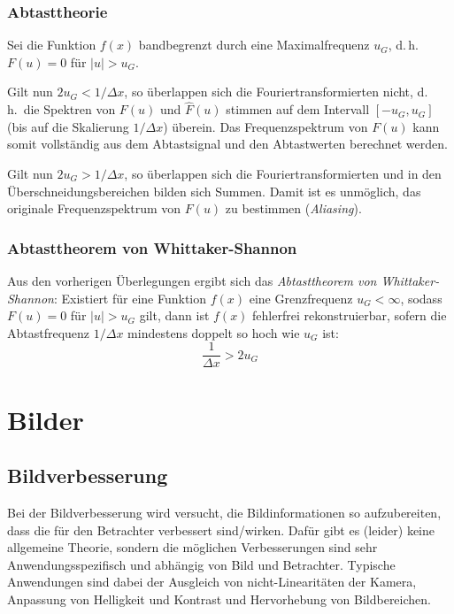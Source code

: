 \documentclass[a4paper, 11pt, accentcolor = tud3b]{tudreport}
\renewcommand{\dh}{d.\,h.~}
\begin{document}
			\subsection{Abtasttheorie}
				Sei die Funktion \( f(x) \) bandbegrenzt durch eine Maximalfrequenz \( u_G \), \dh \( F(u) = 0 \) für \( \lvert u \rvert > u_G \).
				
				Gilt nun \( 2u_G < 1 / \Delta x \), so überlappen sich die Fouriertransformierten nicht, \dh die Spektren von \( F(u) \) und \( \hat{F}(u) \) stimmen auf dem Intervall \( [-u_G, u_G] \) (bis auf die Skalierung \( 1 / \Delta x \)) überein. Das Frequenzspektrum von \( F(u) \) kann somit vollständig aus dem Abtastsignal und den Abtastwerten berechnet werden.
				
				Gilt nun \( 2u_G > 1 / \Delta x \), so überlappen sich die Fouriertransformierten und in den Überschneidungsbereichen bilden sich Summen. Damit ist es unmöglich, das originale Frequenzspektrum von \( F(u) \) zu bestimmen (\emph{Aliasing}).

			\subsection{Abtasttheorem von Whittaker-Shannon}
				Aus den vorherigen Überlegungen ergibt sich das \emph{Abtasttheorem von Whittaker-Shannon}: Existiert für eine Funktion \( f(x) \) eine Grenzfrequenz \( u_G < \infty \), sodass \( F(u) = 0 \) für \( \lvert u \rvert > u_G \) gilt, dann ist \( f(x) \) fehlerfrei rekonstruierbar, sofern die Abtastfrequenz \( 1 / \Delta x \) mindestens doppelt so hoch wie \( u_G \) ist:
				\begin{equation*}
					\frac{1}{\Delta x} > 2 u_G
				\end{equation*}

	\chapter{Bilder}
		\section{Bildverbesserung}
			Bei der Bildverbesserung wird versucht, die Bildinformationen so aufzubereiten, dass die für den Betrachter verbessert sind/wirken. Dafür gibt es (leider) keine allgemeine Theorie, sondern die möglichen Verbesserungen sind sehr Anwendungsspezifisch und abhängig von Bild und Betrachter. Typische Anwendungen sind dabei der Ausgleich von nicht-Linearitäten der Kamera, Anpassung von Helligkeit und Kontrast und Hervorhebung von Bildbereichen.
			
\end{document}
